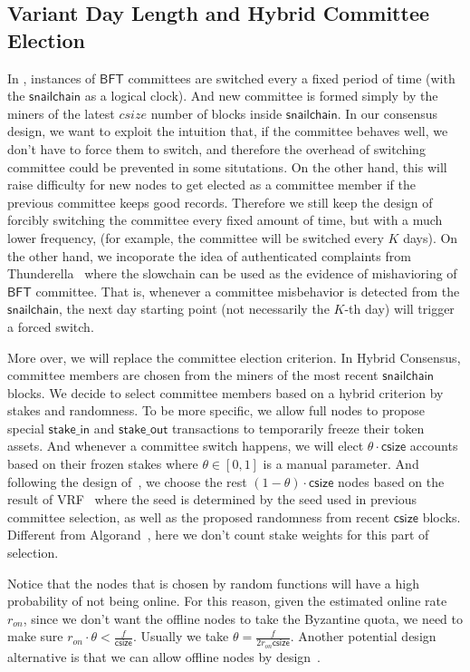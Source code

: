 \subsection{Variant Day Length and Hybrid Committee Election}
\label{sec:election}
In \cite{pass2017hybrid}, instances of $\mathsf{BFT}$ committees are switched every a fixed period of time (with the $\mathsf{snailchain}$ as a logical clock).
And new committee is formed simply by the miners of the latest $csize$ number of blocks inside $\mathsf{snailchain}$. In our consensus design, we want to exploit
the intuition that, if the committee behaves well, we don't have to force them to switch, and therefore the overhead of switching committee could be prevented in
some situtations. On the other hand, this will raise difficulty for new nodes to get elected as a committee member if the previous committee keeps good records.
Therefore we still keep the design of forcibly switching the committee every fixed amount of time, but with a much lower frequency, (for example, the committee
will be switched every $K$ days). On the other hand, we incoporate the idea of authenticated complaints from Thunderella~\cite{pass2017thunderella} where the
slowchain can be used as the evidence of mishavioring of $\mathsf{BFT}$ committee. That is, whenever a committee misbehavior is detected from the
$\mathsf{snailchain}$, the next day starting point (not necessarily the $K$-th day) will trigger a forced switch.

More over, we will replace the committee election criterion. In Hybrid Consensus, committee members are chosen from the miners of the most recent
$\mathsf{snailchain}$ blocks. We decide to select committee members based on a hybrid criterion by stakes and randomness. To be more specific, we allow
full nodes to propose special $\mathsf{stake\_in}$ and $\mathsf{stake\_out}$ transactions to temporarily freeze their token assets. And whenever a committee
switch happens, we will elect $\theta \cdot \mathsf{csize}$ accounts based on their frozen stakes where $\theta \in [0,1]$ is a manual parameter.
And following the design of~\cite{gilad2017algorand}, we choose the rest $(1-\theta)\cdot \mathsf{csize}$ nodes based on the result of
VRF~\cite{micali1999verifiable} where the seed is determined by the seed used in previous committee selection, as well as the proposed randomness
from recent $\mathsf{csize}$ blocks. Different from Algorand~\cite{gilad2017algorand}, here we don't count stake weights for this part of selection.

Notice that the nodes that is chosen by random functions will have a high probability of not being online. For this reason, given the estimated online
rate $r_{on}$, since we don't want the offline nodes to take the Byzantine quota, we need to make sure $r_{on}\cdot \theta < \frac{f}{\mathsf{csize}}$.
Usually we take $\theta = \frac{f}{2 r_{on} \mathsf{csize}}$. Another potential design alternative is that we can allow offline nodes by design~\cite{pass2017sleepy}.

